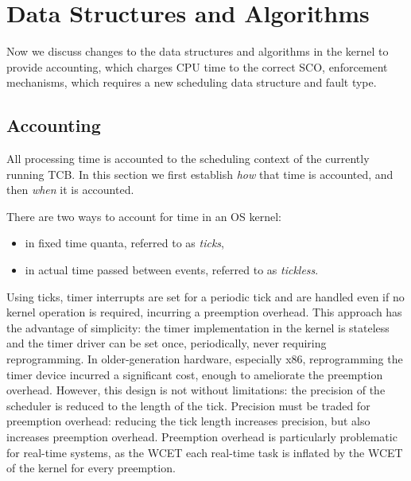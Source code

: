 \section{Data Structures and Algorithms}

Now we discuss changes to the data structures and algorithms in the kernel to provide
accounting, which charges CPU time to the correct \gls{SCO}, enforcement mechanisms, which requires
a new scheduling data structure and fault type.

\subsection{Accounting}

All processing time is accounted to the scheduling context of the currently running \gls{TCB}. 
In this section we first establish \emph{how} that time is accounted, and then \emph{when} it is
accounted.

There are two ways to account for time in an \gls{OS} kernel:
\begin{itemize}
    \item in fixed time quanta, referred to as \emph{ticks},
    \item in actual time passed between events, referred to as \emph{tickless}.
\end{itemize}

Using ticks, timer interrupts are set for a periodic tick and are
handled even if no kernel operation is required, incurring a preemption overhead.
This approach has the advantage of simplicity: the timer implementation in the kernel is 
stateless and the timer driver can be set once, periodically, never requiring reprogramming. 
In older-generation hardware, especially x86, reprogramming the timer device incurred a 
significant cost, enough to ameliorate the preemption overhead. 
However, this design is not without limitations:
the precision of the scheduler is reduced to the length of the tick. Precision must be traded for
preemption overhead: reducing the tick length increases precision, but also increases 
preemption overhead. Preemption overhead is particularly problematic for real-time systems, as
the \gls{WCET} each real-time task is inflated by the \gls{WCET} of the kernel for every preemption.

